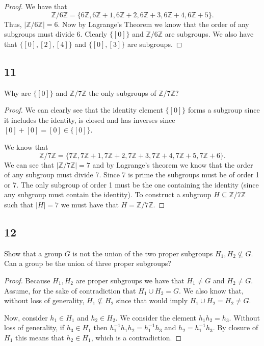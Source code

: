 \documentclass{article}
\newcommand{\Z}{\mathbb{Z}}
\begin{document}
\begin{proof}
    We have that
    \begin{equation*}
        \Z / 6\Z = \{6\Z, 6\Z + 1, 6\Z + 2, 6\Z + 3, 6\Z + 4, 6\Z + 5\}.
    \end{equation*}
    Thus, $|\Z / 6\Z | = 6$. Now by Lagrange's Theorem we know that the order
    of any subgroups must divide 6. Clearly $\{[0]\}$ and $\Z / 6\Z$ are
    subgroups. We also have that $\{[0], [2], [4]\}$ and $\{[0], [3]\}$ are subgroups.
\end{proof}

\subsection*{11}
Why are $\{[0]\}$ and $\Z / 7\Z$ the only subgroups of $\Z / 7\Z$?
\begin{proof}
    We can clearly see that the identity element $\{[0]\}$ forms a subgroup since
    it includes the identity, is closed and has inverses since
    $[0] + [0] = [0] \in \{[0]\}$.

    We know that
    \begin{equation*}
        \Z / 7\Z = \{7\Z, 7\Z + 1, 7\Z + 2, 7\Z + 3, 7\Z + 4, 7\Z + 5, 7\Z + 6\}.
    \end{equation*}
    We can see that $|\Z / 7\Z| = 7$ and by Lagrange's theorem we know that the
    order of any subgroup must divide 7. Since 7 is prime the subgroups must be
    of order 1 or 7. The only subgroup of order 1 must be the one containing
    the identity (since any subgroup must contain the identity). To construct
    a subgroup $H \subseteq \Z / 7\Z$ such that $|H| = 7$ we must have that
    $H = \Z / 7\Z$.
\end{proof}

\subsection*{12}
Show that a group $G$ is not the union of the two proper subgroups
$H_1, H_2 \not \subseteq G$. Can a group be the union of three proper subgroups?

\begin{proof}
    Because $H_1, H_2$ are proper subgroups we have that $H_1 \neq G$ and $H_2 \neq G$.
    Assume, for the sake of contradiction that $H_1 \cup H_2 = G$.
    We also know that, without loss of generality, $H_1 \not \subseteq H_2$ since
    that would imply $H_1 \cup H_2 = H_2 \neq G$.

    Now, consider $h_1 \in H_1$ and $h_2 \in H_2$. We consider the element
    $h_1h_2 = h_3$. Without loss of generality, if $h_3 \in H_1$ then
    $h_1^{-1}h_1h_2 = h_1^{-1}h_3$
    and $h_2 = h_1^{-1}h_3$. By closure of $H_1$ this means that $h_2 \in H_1$, which is
    a contradiction.
\end{proof}
\end{document}
